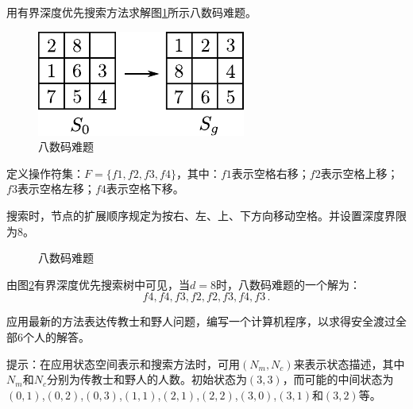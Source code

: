 \begin{question}
用有界深度优先搜索方法求解图\ref{Fig:8-code}所示八数码难题。
	\begin{figure}[H]
		\centering
		\includegraphics{figures/ques-3.7.pdf}
		\caption{八数码难题} \label{Fig:8-code}
	\end{figure}
\end{question}
\begin{solution}
定义操作符集：$F=\{f1,f2,f3,f4\}$，其中：$f1$表示空格右移；$f2$表示空格上移；$f3$表示空格左移；$f4$表示空格下移。\par
搜索时，节点的扩展顺序规定为按右、左、上、下方向移动空格。并设置深度界限为$8$。\par
	\begin{figure}[H]
		\centering
		
		\caption{八数码难题} \label{Fig:8-digits-search-dfs}
	\end{figure}
由图\ref{Fig:8-digits-search-dfs}有界深度优先搜索树中可见，当$d=8$时，八数码难题的一个解为：
\[f4, f4, f3, f2, f2, f3, f4, f3 \, .\]
\end{solution}

\begin{question}
应用最新的方法表达传教士和野人问题，编写一个计算机程序，以求得安全渡过全部$6$个人的解答。
\end{question}
\begin{solution}
提示：在应用状态空间表示和搜索方法时，可用$(N_m,N_c)$来表示状态描述，其中$N_m$和$N_c$分别为传教士和野人的人数。初始状态为$(3,3)$，而可能的中间状态为$(0,1)$,$(0,2)$,$(0,3)$,$(1,1)$,$(2,1)$,$(2,2)$,$(3,0)$,$(3,1)$和$(3,2)$等。
\end{solution}

